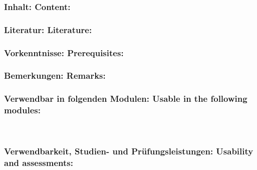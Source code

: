 \documentclass[a4paper,10pt]{article}
\begin{document}
\subsubsection*{\large
    Inhalt:
    Content:
}
\subsubsection*{\large
    Literatur:
    Literature:
}
\subsubsection*{\large
    Vorkenntnisse:
    Prerequisites:
}
\subsubsection*{\large
    Bemerkungen:
    Remarks:
}
\subsubsection*{\large
    Verwendbar in folgenden Modulen:
    Usable in the following modules:
}
\\

\subsubsection*{\large
    Verwendbarkeit, Studien- und Prüfungsleistungen:
    Usability and assessments:
}
\end{document}
